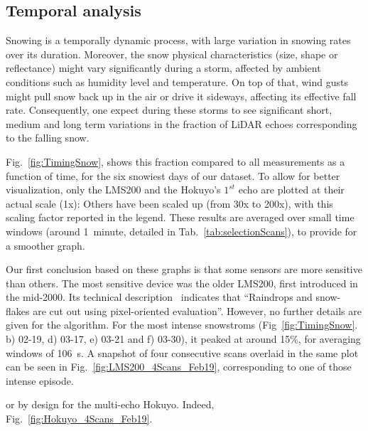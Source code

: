 
\subsection{Temporal analysis}
Snowing is a temporally dynamic process, with large variation in snowing rates over its duration. Moreover, the snow physical characteristics (size, shape or reflectance) might vary significantly during a storm, affected by ambient conditions such as humidity level and temperature. On top of that, wind gusts might pull snow back up in the air or drive it sideways, affecting its effective fall rate. Consequently, one expect during these storms to see significant short, medium and long term variations in the fraction of LiDAR echoes corresponding to the falling snow.

Fig.~\ref{fig:TimingSnow}, shows this fraction compared to all measurements as a function of time, for the six snowiest days of our dataset. To allow for better visualization, only the LMS200 and the Hokuyo's $1^{st}$ echo are plotted at their actual scale (1x): Others have been scaled up (from 30x to 200x), with this scaling factor reported in the legend. These results are averaged over small time windows (around 1~minute, detailed in Tab.~\ref{tab:selectionScans}), to provide for a smoother graph.

Our first conclusion based on these graphs is that some sensors are more sensitive than others. The most sensitive device was the older LMS200, first introduced in the mid-2000. Its technical description~\cite{LMS200Manual} indicates that ``Raindrops and snow-flakes are cut out using pixel-oriented evaluation''. However, no further details are given for the algorithm. For the most intense snowstroms (Fig~\ref{fig:TimingSnow}. b) 02-19, d) 03-17, e) 03-21 and f) 03-30), it peaked at around 15\%, for averaging windows of \SI{106}{\second}. A snapshot of four consecutive scans overlaid in the same plot can be seen in Fig.~\ref{fig:LMS200_4Scans_Feb19}, corresponding to one of those intense episode.

or by design for the multi-echo Hokuyo. Indeed, Fig.~\ref{fig:Hokuyo_4Scans_Feb19}.

